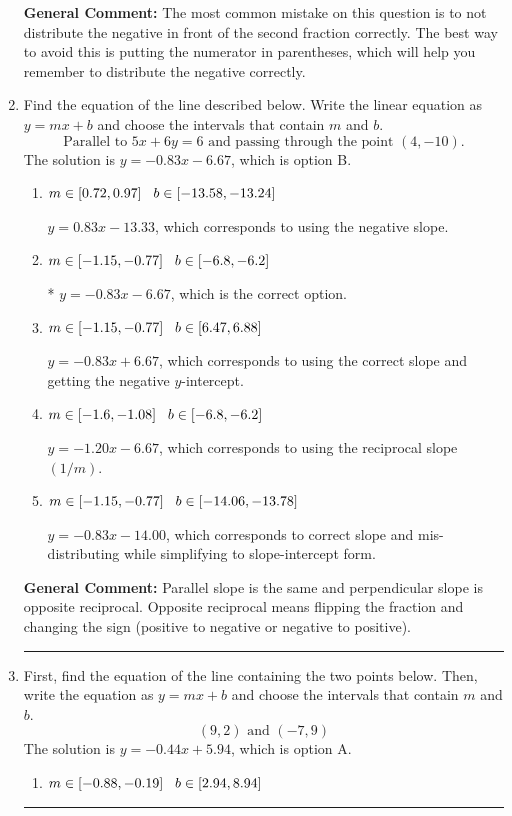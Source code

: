 \documentclass{extbook}[14pt]
\newcommand{\litem}[1]{\item #1

\rule{\textwidth}{0.4pt}}
\begin{document}
\begin{enumerate}
{\textbf{General Comment:} The most common mistake on this question is to not distribute the negative in front of the second fraction correctly. The best way to avoid this is putting the numerator in parentheses, which will help you remember to distribute the negative correctly.
}
\litem{
Find the equation of the line described below. Write the linear equation as $ y=mx+b $ and choose the intervals that contain $m$ and $b$.
\[ \text{Parallel to } 5 x + 6 y = 6 \text{ and passing through the point } (4, -10). \]The solution is \( y = -0.83x - 6.67 \), which is option B.\begin{enumerate}[label=\Alph*.]
\item \( m \in [0.72, 0.97] \hspace*{3mm} b \in [-13.58, -13.24] \)

 $y = 0.83x - 13.33$, which corresponds to using the negative slope.
\item \( m \in [-1.15, -0.77] \hspace*{3mm} b \in [-6.8, -6.2] \)

* $y = -0.83x - 6.67$, which is the correct option.
\item \( m \in [-1.15, -0.77] \hspace*{3mm} b \in [6.47, 6.88] \)

 $y = -0.83x + 6.67$, which corresponds to using the correct slope and getting the negative $y$-intercept.
\item \( m \in [-1.6, -1.08] \hspace*{3mm} b \in [-6.8, -6.2] \)

 $y = -1.20x - 6.67$, which corresponds to using the reciprocal slope $(1/m)$.
\item \( m \in [-1.15, -0.77] \hspace*{3mm} b \in [-14.06, -13.78] \)

 $y = -0.83x - 14.00$, which corresponds to correct slope and mis-distributing while simplifying to slope-intercept form.
\end{enumerate}

\textbf{General Comment:} Parallel slope is the same and perpendicular slope is opposite reciprocal. Opposite reciprocal means flipping the fraction and changing the sign (positive to negative or negative to positive).
}
\litem{
First, find the equation of the line containing the two points below. Then, write the equation as $ y=mx+b $ and choose the intervals that contain $m$ and $b$.
\[ (9, 2) \text{ and } (-7, 9) \]The solution is \( y = -0.44x + 5.94 \), which is option A.\begin{enumerate}[label=\Alph*.]
\item \( m \in [-0.88, -0.19] \hspace*{3mm} b \in [2.94, 8.94] \)


\end{enumerate}}
\end{enumerate}
\end{document}
